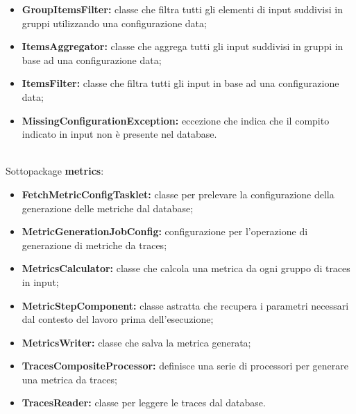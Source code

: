 		\begin{itemize}
			\item \textbf{GroupItemsFilter:} classe che filtra tutti gli elementi di input suddivisi 
				in gruppi utilizzando una configurazione data;
			\item \textbf{ItemsAggregator:} classe che aggrega tutti gli input suddivisi in gruppi 
				in base ad una configurazione data;
			\item \textbf{ItemsFilter:} classe che filtra tutti gli input in base ad una configurazione
				data;
			\item \textbf{MissingConfigurationException:} eccezione che indica che il compito indicato in
				input non è presente nel database.			
		\end{itemize}\\
		
		Sottopackage \textbf{metrics}:
		\begin{itemize}
			\item \textbf{FetchMetricConfigTasklet:} classe per prelevare la configurazione della generazione
				delle metriche dal database;
			\item \textbf{MetricGenerationJobConfig:} configurazione per l'operazione di generazione di metriche
				da traces;
			\item \textbf{MetricsCalculator:} classe che calcola una metrica da ogni gruppo di traces in input;
			\item \textbf{MetricStepComponent:} classe astratta che recupera i parametri necessari dal contesto 
				del lavoro prima dell'esecuzione;
			\item \textbf{MetricsWriter:} classe che salva la metrica generata;
			\item \textbf{TracesCompositeProcessor:} definisce una serie di processori per generare una metrica
				da traces;
			\item \textbf{TracesReader:} classe per leggere le traces dal database.
		\end{itemize}\\
		
